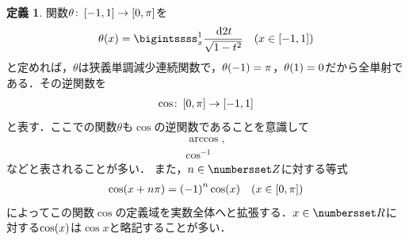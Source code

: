 \documentclass[11pt,a4paper]{ltjsarticle}
\newcommand*{\intd}{\dl2}
\newcommand*{\inv}[1]{{#1}^{-1}}
\theoremstyle{definition}
\newtheorem{dfn}{定義}[section]
\begin{document}
\begin{dfn} \label{dfn:cos}
  関数$\theta \colon \interval{c}{-1, 1} \to \interval{c}{0,\pi}$を
  \begin{align}
    \apply{\theta}{x} = \bigintssss_x^1 \frac{\intd t}{\sqrt{1 - t^2}} \quad \text{($x \in \interval{c}{-1,1}$)}
    \label{eq:arcx}
  \end{align}
  と定めれば，$\theta$は狭義単調減少連続関数で，$\apply{\theta}{-1} = \pi$，$\apply{\theta}{1} = 0$だから全単射である．その逆関数を
  \begin{align}
    \cos \colon \interval{c}{0, \pi} \to \interval{c}{-1,1}
    \label{eq:cos}
  \end{align}
  と表す．ここでの関数$\theta$も$\cos$の逆関数であることを意識して
  \begin{align}
    \arccos,
    \label{eq:arccos} \\
    \inv{\cos}
    \label{eq:invcos}
  \end{align}
  などと表されることが多い．
  また，$n \in \Zahlen$に対する等式
  \begin{align}
    \apply{\cos}{x + n \pi} = \paren{-1}^n \apply{\cos}{x} \quad \text{($\textstyle x \in \interval{c}{0, \pi}$)}
    \label{eq:cosperiod}
  \end{align}
  によってこの関数$\cos$の定義域を実数全体へと拡張する．$x \in \Real$に対する$\apply{\cos}{x}$は$\cos x$と略記することが多い．
\end{dfn}
\end{document}
